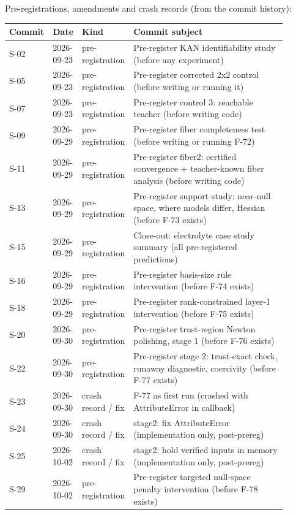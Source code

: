 \noindent Pre-registrations, amendments and crash records (from the commit history):

{\footnotesize\setlength{\tabcolsep}{3pt}
\begin{longtable}{R{0.08\linewidth} R{0.10\linewidth} R{0.14\linewidth} R{0.58\linewidth}}
\toprule
Commit & Date & Kind & Commit subject \\
\midrule
\endhead
S-02 & 2026-09-23 & pre-registration & Pre-register KAN identifiability study (before any experiment) \\
S-05 & 2026-09-23 & pre-registration & Pre-register corrected 2x2 control (before writing or running it) \\
S-07 & 2026-09-23 & pre-registration & Pre-register control 3: reachable teacher (before writing code) \\
S-09 & 2026-09-29 & pre-registration & Pre-register fiber completeness test (before writing or running F-72) \\
S-11 & 2026-09-29 & pre-registration & Pre-register fiber2: certified convergence + teacher-known fiber analysis (before writing code) \\
S-13 & 2026-09-29 & pre-registration & Pre-register support study: near-null space, where models differ, Hessian (before F-73 exists) \\
S-15 & 2026-09-29 & pre-registration & Close-out: electrolyte case study summary (all pre-registered predictions) \\
S-16 & 2026-09-29 & pre-registration & Pre-register basis-size rule intervention (before F-74 exists) \\
S-18 & 2026-09-29 & pre-registration & Pre-register rank-constrained layer-1 intervention (before F-75 exists) \\
S-20 & 2026-09-30 & pre-registration & Pre-register trust-region Newton polishing, stage 1 (before F-76 exists) \\
S-22 & 2026-09-30 & pre-registration & Pre-register stage 2: trust-exact check, runaway diagnostic, coercivity (before F-77 exists) \\
S-23 & 2026-09-30 & crash record / fix & F-77 as first run (crashed with AttributeError in callback) \\
S-24 & 2026-09-30 & crash record / fix & stage2: fix AttributeError (implementation only, post-prereg) \\
S-25 & 2026-10-02 & crash record / fix & stage2: hold verified inputs in memory (implementation only, post-prereg) \\
S-29 & 2026-10-02 & pre-registration & Pre-register targeted null-space penalty intervention (before F-78 exists) \\

\end{longtable}}
